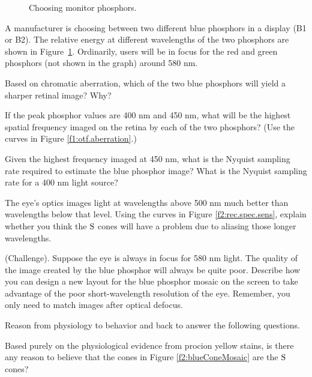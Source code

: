\begin{figure}
\centerline{
}
\caption{
Choosing monitor phosphors.
}
\label{f2:bluePhosphors}
\end{figure}
\item A manufacturer is choosing between two different blue
phosphors in a display (B1 or B2).
The relative energy at different wavelengths of the
two phosphors are shown in Figure~\ref{f2:bluePhosphors}.
Ordinarily, users will be in focus for the red and green
phosphors (not shown in the graph) around 580 nm.

 \be

 \item Based on chromatic aberration, 
which of the two blue
phosphors will yield a sharper retinal image? Why?

 \item If the peak phosphor values are 400 nm and 450 nm,
what will be the highest spatial frequency imaged on the retina
by each of the two phosphors?
(Use the curves in Figure \ref{f1:otf.aberration}.)

 \item Given the highest frequency imaged at 450 nm, what is the
Nyquist sampling rate required to estimate the blue phosphor image?
What is the Nyquist sampling rate for a 400 nm light source?

 \item The eye's optics images
light at wavelengths above 500 nm much better than wavelengths
below that level.
Using the curves in Figure \ref{f2:rec.spec.sens},
explain whether you think the $\mbox{S}$ cones 
will have a problem due to aliasing those longer wavelengths.

 \item (Challenge).  Suppose the eye is always in focus
for 580 nm light.
The quality of the image created by the blue phosphor will
always be quite poor.
Describe how you can design a new layout for the blue phosphor
mosaic on the screen to take advantage of the poor short-wavelength
resolution of the eye.
Remember, you only need to match images after optical defocus.
 \ee

\item Reason from physiology to behavior and back
to answer the following questions.

 \be

 \item Based purely on the physiological evidence from procion
yellow stains, is there any reason to believe that
the cones in Figure \ref{f2:blueConeMosaic} are the $\mbox{S}$ cones?

